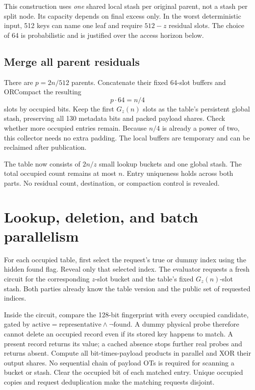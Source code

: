 \documentclass[11pt]{article}
\newcommand{\AND}{\mathbin{\wedge}}
\begin{document}
This construction uses \emph{one} shared local stash per original parent,
not a stash per split node. Its capacity depends on final excess only.
In the worst deterministic input, 512 keys can name one leaf and require
$512-z$ residual slots. The choice of 64 is probabilistic and is justified
over the access horizon below.

\subsection{Merge all parent residuals}
There are $p=2n/512$ parents. Concatenate their fixed 64-slot buffers and
ORCompact the resulting
\begin{equation}
 p\cdot64=n/4
\end{equation}
slots by occupied bits. Keep the first $G_z(n)$ slots as the table's
persistent global stash, preserving all 130 metadata bits and packed
payload shares. Check whether more occupied entries remain. Because $n/4$
is already a power of two, this collector needs no extra padding.
The local buffers are temporary and can be reclaimed after publication.

The table now consists of $2n/z$ small lookup buckets and one global stash.
The total occupied count remains at most $n$. Entry uniqueness holds across
both parts. No residual count, destination, or compaction control is revealed.

\section{Lookup, deletion, and batch parallelism}
For each occupied table, first select the request's true or dummy index
using the hidden found flag. Reveal only that selected index. The evaluator
requests a fresh circuit for the corresponding $z$-slot bucket and the
table's fixed $G_z(n)$-slot stash. Both parties already know the table
version and the public set of requested indices.

Inside the circuit, compare the 128-bit fingerprint with every occupied
candidate, gated by $\mathrm{active}=\mathrm{representative}\AND\neg\mathrm{found}$.
A dummy physical probe therefore cannot delete an occupied record even
if its stored key happens to match. A present
record returns its value; a cached absence stops further real probes and
returns absent. Compute all bit-times-payload products in parallel and
XOR their output shares. No sequential chain of payload OTs is required
for scanning a bucket or stash. Clear the occupied bit of each matched
entry. Unique occupied copies and request deduplication make the matching
requests disjoint.
\end{document}
